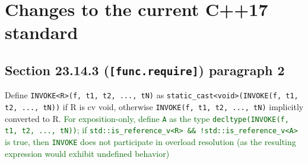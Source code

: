 \documentclass{article}
\begin{document}
\section{Changes to the current C++17 standard}
\subsection{Section 23.14.3 (\texttt{[func.require]}) paragraph 2}
Define \texttt{INVOKE<R>(f, t1, t2, ..., tN)} as
\texttt{static\_cast<void>(INVOKE(f, t1, t2, ..., tN))} if R is cv void,
otherwise \texttt{INVOKE(f, t1, t2, ..., tN)} implicitly converted to R.
\textcolor{darkgreen}{For exposition-only, define \texttt{A} as the type
\texttt{decltype(INVOKE(f, t1, t2, ..., tN))}; if
\texttt{std::is\_reference\_v<R> && !std::is\_reference\_v<A>} is true, then
\texttt{INVOKE} does not participate in overload resolution (as the resulting
expression would exhibit undefined behavior)}
\end{document}

